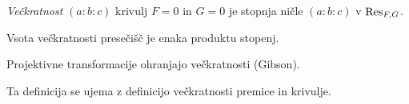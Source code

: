 \begin{definicija}
\emph{Večkratnost} $(a : b : c)$
krivulj $F = 0$ in $G = 0$ je stopnja ničle $(a : b : c)$ v
$\operatorname{Res}_{F,G}$.
\end{definicija}

\begin{posledica}
Vsota večkratnosti presečišč je enaka produktu stopenj.
\end{posledica}

\begin{opomba}
Projektivne transformacije ohranjajo večkratnosti (Gibson).
\end{opomba}

\begin{opomba}
Ta definicija se ujema z definicijo večkratnosti premice in
krivulje.
\end{opomba}
